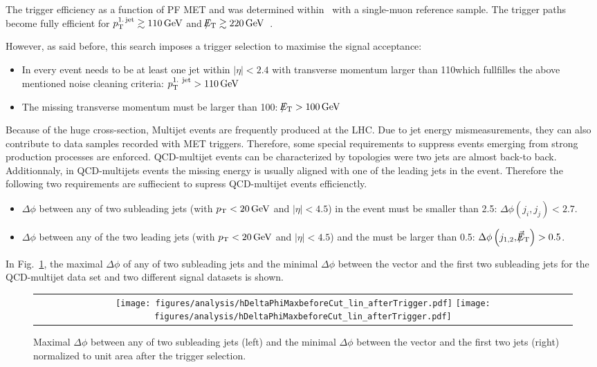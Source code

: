 The trigger efficiency as a function of PF MET and \ptfirstjet was determined within~\cite{bib:CMS:DM_8TeV} with a single-muon reference sample.
The trigger paths become fully efficient for $p_{\text{T}}^{\text{1.\,jet}} \gtrsim 110\,\text{Ge}\kern-0.06667em\text{V}$ and $\slash\mkern-12mu{E}_{\text{T}} \gtrsim 220\,\text{Ge}\kern-0.06667em\text{V}$~\cite{bib:CMS:DM_8TeV_AN}.

However, as said before, this search imposes a trigger selection to maximise the signal acceptance:
\begin{itemize}
\renewcommand{\labelitemi}{\footnotesize{\ding{118}}}
\item In every event needs to be at least one jet within $|\eta|<2.4$ with transverse momentum larger than 110\gev which fullfilles the above mentioned noise cleaning criteria: \mbox{$p_{\text{T}}^{\text{1. jet}}>110\,\text{Ge}\kern-0.06667em\text{V}$}
\item The missing transverse momentum must be larger than 100\gev: \mbox{$\slash\mkern-12mu{E}_{\text{T}}>100\,\text{Ge}\kern-0.06667em\text{V}$}
\end{itemize}

\hspace{0.9cm}

Because of the huge cross-section, Multijet events are frequently produced at the LHC.
Due to jet energy mismeasurements, they can also contribute to data samples recorded with MET triggers.
Therefore, some special requirements to suppress events emerging from strong production processes are enforced.
QCD-multijet events can be characterized by topologies were two jets are almost back-to back.
Additionnaly, in QCD-multijets events the missing energy is usually aligned with one of the leading jets in the event.
Therefore the following two requirements are suffiecient to supress QCD-multijet events efficienctly.
\begin{itemize}
\renewcommand{\labelitemi}{\footnotesize{\ding{118}}}
\item $\Delta\phi$ between any of two subleading jets (with $p_{\text{T}}<20\,\text{Ge}\kern-0.06667em\text{V}$ and $|\eta|<4.5$) in the event must be smaller than 2.5: \mbox{$\Delta\phi\left( j_i, j_j\right)<2.7$}.
\item $\Delta\phi$ between any of the two leading jets (with $p_{\text{T}}<20\,\text{Ge}\kern-0.06667em\text{V}$ and $|\eta|<4.5$) and the \met must be larger than 0.5: \mbox{$\Delta\phi\left( j_{1,2}, \slash\mkern-12mu{\vec{E}}_{\text{T}} \right) > 0.5$.} 
\end{itemize}
In Fig.~\ref{fig:QCDcuts}, the maximal $\Delta \phi$ of any of two subleading jets  and the minimal $\Delta \phi$ between the \met vector and the first two subleading jets for the QCD-multijet data set and two different signal datasets is shown.\\
\begin{figure}[!t]
  \centering 
  \begin{tabular}{c}
    \texttt{[image: figures/analysis/hDeltaPhiMaxbeforeCut\_lin\_afterTrigger.pdf]}
    \texttt{[image: figures/analysis/hDeltaPhiMaxbeforeCut\_lin\_afterTrigger.pdf]}
  \end{tabular}
  \caption{Maximal $\Delta \phi$ between any of two subleading jets (left) and the minimal $\Delta \phi$  between the \met vector and the first two jets (right) normalized to unit area after the trigger selection.}
  \label{fig:QCDcuts}
\end{figure}
\hspace{0.9cm}

